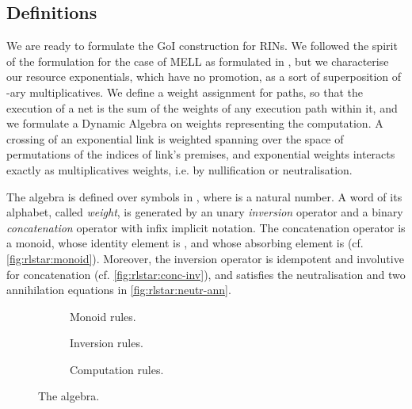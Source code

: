 \subsection{Definitions}
We are ready to formulate the GoI construction for RINs.
We followed the spirit of the formulation for the case of MELL as formulated in 
\cite{DanosRegnier:1995}, but we characterise our resource exponentials,
which have no promotion, as a sort of superposition of -ary multiplicatives.
We define a weight assignment for paths, so that the execution of a net is
the sum of the weights of any execution path within it, and we formulate a 
Dynamic Algebra  on weights representing the computation.
A crossing of an exponential link is weighted spanning over the space of 
permutations of the indices of link's premises, and exponential weights 
interacts exactly as multiplicatives weights, i.e. by nullification or 
neutralisation.

\begin{definition}\label{def:rlstar}
The  algebra is defined over symbols in
, where  is a natural number.
A word of its alphabet, called \textit{weight}, is generated by an unary 
\textit{inversion} operator  and a binary \textit{concatenation} 
operator with infix implicit notation.
The concatenation operator is a monoid, whose identity element is , and 
whose absorbing element is  (cf. \autoref{fig:rlstar:monoid}).
Moreover, the inversion operator is idempotent and involutive for concatenation
(cf. \autoref{fig:rlstar:conc-inv}), and satisfies the neutralisation and 
two annihilation equations in \autoref{fig:rlstar:neutr-ann}.
\end{definition}

\begin{figure}
  \vspace{0.3em}
  \begin{subfigure}{0.28\textwidth}
    \caption{Monoid rules.}
    \label{fig:rlstar:monoid}
    \vspace{-1.5em}
    
  \end{subfigure}
  \hfill
  \begin{subfigure}{0.23\textwidth}
    \caption{Inversion rules.}
    \label{fig:rlstar:conc-inv}
    \vspace{-1.5em}
    
  \end{subfigure} 
  \hfill
  \begin{subfigure}{0.28\textwidth}
    \caption{Computation rules.}
    \label{fig:rlstar:neutr-ann}
    \vspace{-1.5em}
    
  \end{subfigure}
  \caption{The  algebra.}
\end{figure}

